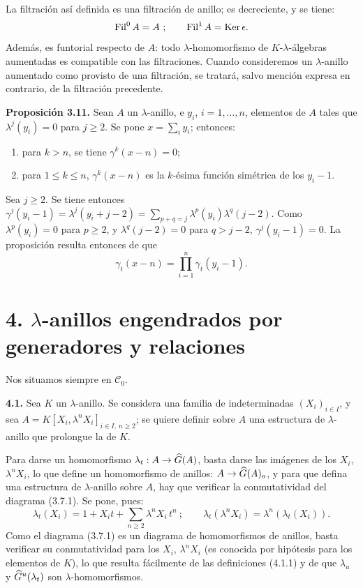 La filtración así definida es una filtración de anillo; es decreciente, y se tiene:
\[
  \operatorname{Fil}^0A=A~;
  \qquad \operatorname{Fil}^1A=\operatorname{Ker}\epsilon.
\]
Además, es funtorial respecto de \(A\): todo \(\lambda\)-homomorfismo de \(K\)-\(\lambda\)-álgebras aumentadas es compatible con las filtraciones. Cuando consideremos un \(\lambda\)-anillo aumentado como provisto de una filtración, se tratará, salvo mención expresa en contrario, de la filtración precedente.

\textbf{Proposición 3.11.} Sean \(A\) un \(\lambda\)-anillo, e \(y_i\), \(i=1,\dots,n\), elementos de \(A\) tales que \(\lambda^j(y_i)=0\) para \(j\ge2\). Se pone \(x=\sum_i y_i\); entonces:
\begin{enumerate}[label=\roman*)]
\item para \(k>n\), se tiene \(\gamma^k(x-n)=0\);
\item para \(1\le k\le n\), \(\gamma^k(x-n)\) es la \(k\)-ésima función simétrica de los \(y_i-1\).
\end{enumerate}
Sea \(j\ge2\). Se tiene entonces \(\gamma^j(y_i-1)=\lambda^j(y_i+j-2)=\sum_{p+q=j}\lambda^p(y_i)\lambda^q(j-2)\). Como \(\lambda^p(y_i)=0\) para \(p\ge2\), y \(\lambda^q(j-2)=0\) para \(q>j-2\), \(\gamma^j(y_i-1)=0\). La proposición resulta entonces de que
\[
  \gamma_t(x-n)=\prod_{i=1}^{n}\gamma_t(y_i-1).
\]

\section*{4. \(\lambda\)-anillos engendrados por generadores y relaciones}

Nos situamos siempre en \(\mathcal C_0\).

\textbf{4.1.} Sea \(K\) un \(\lambda\)-anillo. Se considera una familia de indeterminadas \((X_i)_{i\in I}\), y sea \(A=K[X_i,\lambda^n X_i]_{i\in I,\ n\ge2}\); se quiere definir sobre \(A\) una estructura de \(\lambda\)-anillo que prolongue la de \(K\).

Para darse un homomorfismo \(\lambda_t:A\to\widehat G(A)\), basta darse las imágenes de los \(X_i\), \(\lambda^n X_i\), lo que define un homomorfismo de anillos: \(A\to\widehat G(A)_o\), y para que defina una estructura de \(\lambda\)-anillo sobre \(A\), hay que verificar la conmutatividad del diagrama (3.7.1). Se pone, pues:
\begin{equation}\tag{4.1.1}
  \lambda_t(X_i)=1+X_it+\sum_{n\ge2}\lambda^n X_i\,t^n~;
  \qquad
  \lambda_t(\lambda^n X_i)=\lambda^n(\lambda_t(X_i)).
\end{equation}
Como el diagrama (3.7.1) es un diagrama de homomorfismos de anillos, basta verificar su conmutatividad para los \(X_i\), \(\lambda^n X_i\) (es conocida por hipótesis para los elementos de \(K\)), lo que resulta fácilmente de las definiciones (4.1.1) y de que \(\lambda_u\) y \(\widehat G^u(\lambda_t)\) son \(\lambda\)-homomorfismos.

